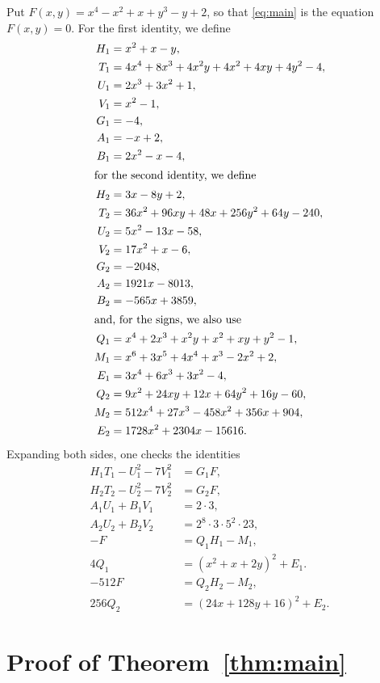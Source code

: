 \documentclass[11pt]{article}
\begin{document}
Put $F(x,y)=x^{4}-x^{2}+x+y^{3}-y+2$, so that \eqref{eq:main} is the equation $F(x,y)=0$.
For the first identity, we define
\begin{align*}
H_{1}&=x^{2}+x-y,\\
T_{1}&=4x^{4}+8x^{3}+4x^{2}y+4x^{2}+4xy+4y^{2}-4,\\
U_{1}&=2x^{3}+3x^{2}+1,\\
V_{1}&=x^{2}-1,\\
G_{1}&=-4,\\
A_{1}&=-x+2,\\
B_{1}&=2x^{2}-x-4,\\
\intertext{for the second identity, we define}
H_{2}&=3x-8y+2,\\
T_{2}&=36x^{2}+96xy+48x+256y^{2}+64y-240,\\
U_{2}&=5x^{2}-13x-58,\\
V_{2}&=17x^{2}+x-6,\\
G_{2}&=-2048,\\
A_{2}&=1921x-8013,\\
B_{2}&=-565x+3859,\\
\intertext{and, for the signs, we also use}
Q_{1}&=x^{4}+2x^{3}+x^{2}y+x^{2}+xy+y^{2}-1,\\
M_{1}&=x^{6}+3x^{5}+4x^{4}+x^{3}-2x^{2}+2,\\
E_{1}&=3x^{4}+6x^{3}+3x^{2}-4,\\
Q_{2}&=9x^{2}+24xy+12x+64y^{2}+16y-60,\\
M_{2}&=512x^{4}+27x^{3}-458x^{2}+356x+904,\\
E_{2}&=1728x^{2}+2304x-15616.
\end{align*}
Expanding both sides, one checks the identities
\begin{align}
H_{1}T_{1}-U_{1}^2-7V_{1}^2&=G_{1}F,\label{eq:norm1}\\
H_{2}T_{2}-U_{2}^2-7V_{2}^2&=G_{2}F,\label{eq:norm2}\\
A_{1}U_{1}+B_{1}V_{1}&=2\cdot 3,\label{eq:bez1}\\
A_{2}U_{2}+B_{2}V_{2}&=2^{8}\cdot 3\cdot 5^{2}\cdot 23,\label{eq:bez2}\\
-F&=Q_{1}H_{1}-M_{1},\label{eq:sign1}\\
4Q_{1}&=(x^{2}+x+2y)^2+E_{1}.\label{eq:sign1b}\\
-512F&=Q_{2}H_{2}-M_{2},\label{eq:sign2}\\
256Q_{2}&=(24x+128y+16)^2+E_{2}.\label{eq:sign2b}
\end{align}

\section{Proof of Theorem~\ref{thm:main}}
\end{document}
